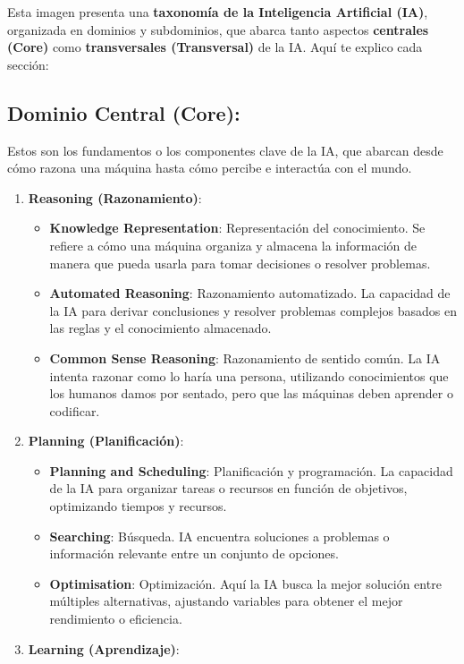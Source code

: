 \documentclass[
  10pt,
  letterpaper,
]{book}
\providecommand{\tightlist}{%
  \setlength{\itemsep}{0pt}\setlength{\parskip}{0pt}}\usepackage{longtable,booktabs,array}
\begin{document}
Esta imagen presenta una \textbf{taxonomía de la Inteligencia Artificial
(IA)}, organizada en dominios y subdominios, que abarca tanto aspectos
\textbf{centrales (Core)} como \textbf{transversales (Transversal)} de
la IA. Aquí te explico cada sección:

\subsection{Dominio Central (Core):}\label{dominio-central-core}

Estos son los fundamentos o los componentes clave de la IA, que abarcan
desde cómo razona una máquina hasta cómo percibe e interactúa con el
mundo.

\begin{enumerate}
\def\labelenumi{\arabic{enumi}.}
\tightlist
\item
  \textbf{Reasoning (Razonamiento)}:

  \begin{itemize}
  \tightlist
  \item
    \textbf{Knowledge Representation}: Representación del conocimiento.
    Se refiere a cómo una máquina organiza y almacena la información de
    manera que pueda usarla para tomar decisiones o resolver problemas.
  \item
    \textbf{Automated Reasoning}: Razonamiento automatizado. La
    capacidad de la IA para derivar conclusiones y resolver problemas
    complejos basados en las reglas y el conocimiento almacenado.
  \item
    \textbf{Common Sense Reasoning}: Razonamiento de sentido común. La
    IA intenta razonar como lo haría una persona, utilizando
    conocimientos que los humanos damos por sentado, pero que las
    máquinas deben aprender o codificar.
  \end{itemize}
\item
  \textbf{Planning (Planificación)}:

  \begin{itemize}
  \tightlist
  \item
    \textbf{Planning and Scheduling}: Planificación y programación. La
    capacidad de la IA para organizar tareas o recursos en función de
    objetivos, optimizando tiempos y recursos.
  \item
    \textbf{Searching}: Búsqueda. IA encuentra soluciones a problemas o
    información relevante entre un conjunto de opciones.
  \item
    \textbf{Optimisation}: Optimización. Aquí la IA busca la mejor
    solución entre múltiples alternativas, ajustando variables para
    obtener el mejor rendimiento o eficiencia.
  \end{itemize}
\item
  \textbf{Learning (Aprendizaje)}:


\end{enumerate}
\end{document}
